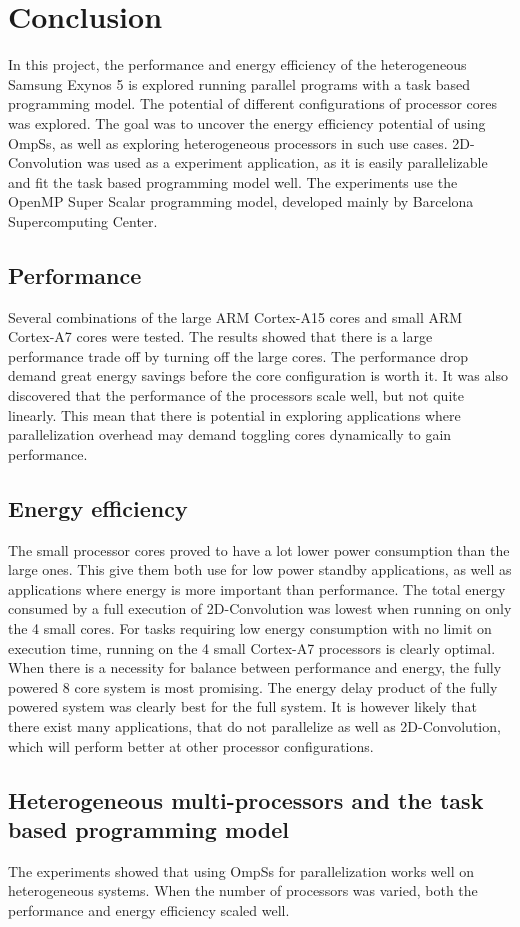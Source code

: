 \chapter[Conclusion]{Conclusion}
In this project, the performance and energy efficiency of the heterogeneous Samsung Exynos 5 is explored running parallel programs with a task based programming model.
The potential of different configurations of processor cores was explored.
The goal was to uncover the energy efficiency potential of using OmpSs, as well as exploring heterogeneous processors in such use cases.
2D-Convolution was used as a experiment application, as it is easily parallelizable and fit the task based programming model well.
The experiments use the OpenMP Super Scalar programming model, developed mainly by Barcelona Supercomputing Center.

\section{Performance}
Several combinations of the large ARM Cortex-A15 cores and small ARM Cortex-A7 cores were tested.
The results showed that there is a large performance trade off by turning off the large cores.
The performance drop demand great energy savings before the core configuration is worth it.
It was also discovered that the performance of the processors scale well, but not quite linearly.
This mean that there is potential in exploring applications where parallelization overhead may demand toggling cores dynamically to gain performance.

\section{Energy efficiency}
The small processor cores proved to have a lot lower power consumption than the large ones.
This give them both use for low power standby applications, as well as applications where energy is more important than performance.
The total energy consumed by a full execution of 2D-Convolution was lowest when running on only the 4 small cores.
For tasks requiring low energy consumption with no limit on execution time, running on the 4 small Cortex-A7 processors is clearly optimal.
When there is a necessity for balance between performance and energy, the fully powered 8 core system is most promising.
The energy delay product of the fully powered system was clearly best for the full system.
It is however likely that there exist many applications, that do not parallelize as well as 2D-Convolution, which will perform better at other processor configurations.

\section{Heterogeneous multi-processors and the task based programming model}
The experiments showed that using OmpSs for parallelization works well on heterogeneous systems.
When the number of processors was varied, both the performance and energy efficiency scaled well.
